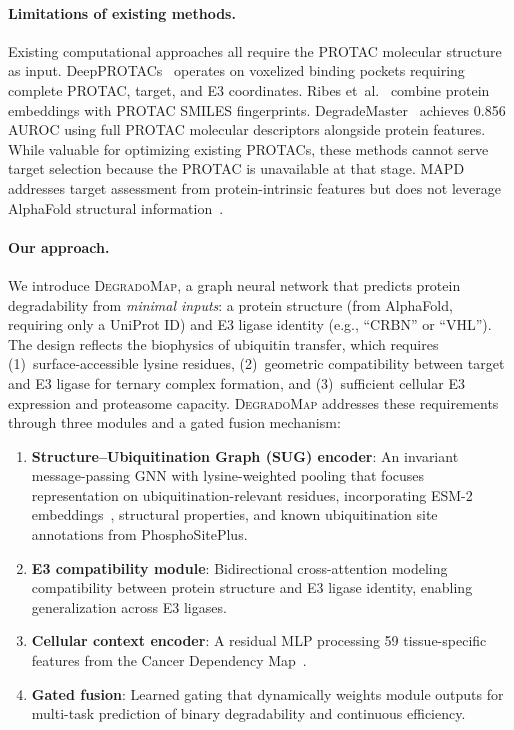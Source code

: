 \documentclass[sigconf]{acmart}
\newcommand{\ours}{\textsc{DegradoMap}}
\begin{document}
\paragraph{Limitations of existing methods.}
Existing computational approaches all require the PROTAC molecular structure as input.
DeepPROTACs~\cite{li2022deepprotacs} operates on voxelized binding pockets requiring complete PROTAC, target, and E3 coordinates.
Ribes et~al.~\cite{ribes2024protac} combine protein embeddings with PROTAC SMILES fingerprints.
DegradeMaster~\cite{liu2025degrademaster} achieves 0.856 AUROC using full PROTAC molecular descriptors alongside protein features.
While valuable for optimizing existing PROTACs, these methods cannot serve target selection because the PROTAC is unavailable at that stage.
MAPD~\cite{zhang2022mapd} addresses target assessment from protein-intrinsic features but does not leverage AlphaFold structural information~\cite{jumper2021alphafold}.

\paragraph{Our approach.}
We introduce \ours{}, a graph neural network that predicts protein degradability from \emph{minimal inputs}: a protein structure (from AlphaFold, requiring only a UniProt ID) and E3 ligase identity (e.g., ``CRBN'' or ``VHL'').
The design reflects the biophysics of ubiquitin transfer, which requires (1)~surface-accessible lysine residues, (2)~geometric compatibility between target and E3 ligase for ternary complex formation, and (3)~sufficient cellular E3 expression and proteasome capacity.
\ours{} addresses these requirements through three modules and a gated fusion mechanism:
\begin{enumerate}
    \item \textbf{Structure--Ubiquitination Graph (SUG) encoder}: An invariant message-passing GNN with lysine-weighted pooling that focuses representation on ubiquitination-relevant residues, incorporating ESM-2 embeddings~\cite{lin2023esm2}, structural properties, and known ubiquitination site annotations from PhosphoSitePlus.
    \item \textbf{E3 compatibility module}: Bidirectional cross-attention modeling compatibility between protein structure and E3 ligase identity, enabling generalization across E3 ligases.
    \item \textbf{Cellular context encoder}: A residual MLP processing 59 tissue-specific features from the Cancer Dependency Map~\cite{tsherniak2017depmap}.
    \item \textbf{Gated fusion}: Learned gating that dynamically weights module outputs for multi-task prediction of binary degradability and continuous efficiency.
\end{enumerate}
\end{document}

